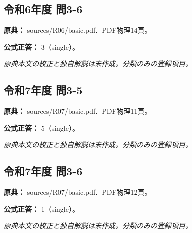 \subsection{令和6年度 問3-6}
\label{q:r06-reg-basic-3-6}

\noindent\textbf{原典：} sources/R06/basic.pdf、PDF物理14頁。

\textbf{公式正答：} 3（single）。

\par\textit{原典本文の校正と独自解説は未作成。分類のみの登録項目。}

\subsection{令和7年度 問3-5}
\label{q:r07-reg-basic-3-5}

\noindent\textbf{原典：} sources/R07/basic.pdf、PDF物理11頁。

\textbf{公式正答：} 5（single）。

\par\textit{原典本文の校正と独自解説は未作成。分類のみの登録項目。}

\subsection{令和7年度 問3-6}
\label{q:r07-reg-basic-3-6}

\noindent\textbf{原典：} sources/R07/basic.pdf、PDF物理12頁。

\textbf{公式正答：} 1（single）。

\par\textit{原典本文の校正と独自解説は未作成。分類のみの登録項目。}
